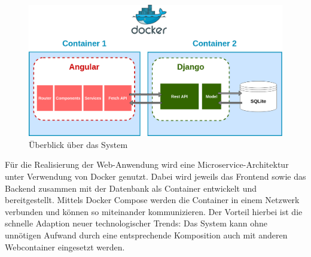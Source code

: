 \documentclass[conference]{IEEEtran}
\begin{document}
\begin{figure}[!h]
	\centering
	\includegraphics[width=0.9\columnwidth]{./figures/architecture_with_docker}
	\caption{Überblick über das System}
\end{figure}
Für die Realisierung der Web-Anwendung wird eine Microservice-Architektur unter Verwendung von Docker genutzt. Dabei wird jeweils das Frontend sowie das Backend zusammen mit der Datenbank als Container entwickelt und bereitgestellt. Mittels Docker Compose werden die Container in einem Netzwerk verbunden und können so miteinander kommunizieren. Der Vorteil hierbei ist die schnelle Adaption neuer technologischer Trends: Das System kann ohne unnötigen Aufwand durch eine entsprechende Komposition auch mit anderen Webcontainer eingesetzt werden.
\pagebreak
\end{document}

